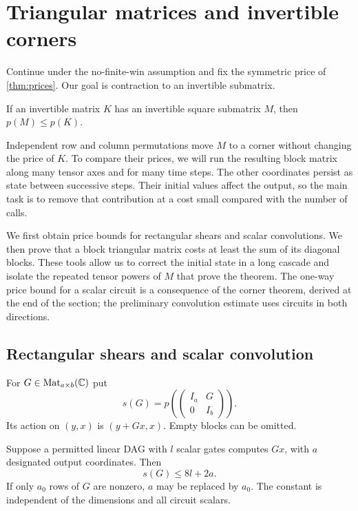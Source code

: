 \section{Triangular matrices and invertible corners}
\label{corner:sec:corners}

Continue under the no-finite-win assumption and fix the symmetric price
of \cref{thm:prices}. Our goal is contraction to an invertible submatrix.

\begin{theorem}
\label{thm:corner}
If an invertible matrix $K$ has an invertible square submatrix $M$,
then $p(M)\le p(K)$.
\end{theorem}

Independent row and column permutations move $M$ to a corner without
changing the price of $K$. To compare their prices, we will run the
resulting block matrix along many tensor axes and for many time steps.
The other coordinates persist as state between successive steps. Their
initial values affect the output, so the main task is to remove that
contribution at a cost small compared with the number of calls.

We first obtain price bounds for rectangular shears and scalar
convolutions. We then prove that a block triangular matrix costs at
least the sum of its diagonal blocks. These tools allow us to correct
the initial state in a long cascade and isolate the repeated tensor
powers of $M$ that prove the theorem. The one-way price bound for a scalar circuit
is a consequence of the corner theorem, derived at the end of the
section; the preliminary convolution estimate uses circuits in both
directions.

\subsection{Rectangular shears and scalar convolution}

For $G\in\operatorname{Mat}_{a\times b}(\mathbb C)$ put
\[
 s(G)=p\left(\begin{pmatrix}I_a&G\\0&I_b\end{pmatrix}\right).
\]
Its action on $(y,x)$ is $(y+Gx,x)$.  Empty blocks can be omitted.

\begin{lemma}
\label{lem:shear-dag}
Suppose a permitted linear DAG with $l$ scalar gates computes $Gx$,
with $a$ designated output coordinates.  Then
\begin{equation}
 s(G)\le 8l+2a.
 \label{corner:eq:shear-dag}
\end{equation}
If only $a_0$ rows of $G$ are nonzero, $a$ may be replaced by $a_0$.
The constant is independent of the dimensions and all circuit scalars.
\end{lemma}

